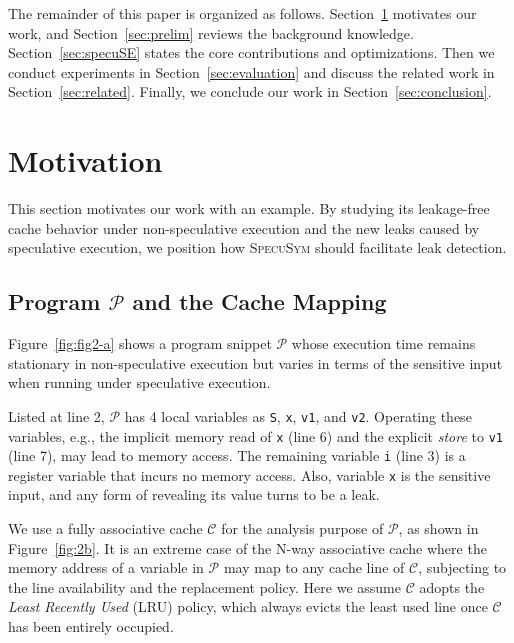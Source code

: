 \documentclass[sigconf,screen]{acmart}
\newcommand{\SpecuSym}{\textsc{SpecuSym} }
\newcommand{\prog}{\mathcal{P}}
\begin{document}
The remainder of this paper is organized as follows. Section~\ref{sec:mtv} 
motivates our work, and Section~\ref{sec:prelim} reviews the background 
knowledge. Section~\ref{sec:specuSE} states the core contributions and
optimizations. Then we conduct experiments in Section~\ref{sec:evaluation} 
and discuss the related work in Section~\ref{sec:related}. Finally, we 
conclude our work in Section~\ref{sec:conclusion}.


\section{Motivation}
\label{sec:mtv}

This section motivates our work with an example. By studying its 
leakage-free cache behavior under non-speculative execution and the new 
leaks caused by speculative execution, we position how \SpecuSym should
facilitate leak detection.


\subsection{Program ${\prog}$ and the Cache Mapping}
\label{sec:leak_example}

Figure~\ref{fig:fig2-a} shows a program snippet ${\prog}$ whose execution 
time remains stationary in non-speculative execution but varies in terms
of the sensitive input when running under speculative execution.


Listed at line 2, ${\prog}$ has 4 local variables as \texttt{S}, \texttt{x}, 
\texttt{v1}, and \texttt{v2}. Operating these variables, e.g., the implicit 
memory read of \texttt{x} (line 6) and the explicit \emph{store} to \texttt{v1} 
(line 7), may lead to memory access. The remaining variable \texttt{i} (line 3) 
is a register variable that incurs no memory access. Also, variable \texttt{x} 
is the sensitive input, and any form of revealing its value turns to be a leak. 



We use a fully associative cache $\mathcal{C}$ for the analysis purpose of 
$\prog$, as shown in Figure~\ref{fig:2b}. It is an extreme case of the N-way 
associative cache where the memory address of a variable in $\prog$ may map 
to any cache line of $\mathcal{C}$, subjecting to the line availability and 
the replacement policy. Here we assume $\mathcal{C}$ adopts the \emph{Least
Recently Used} (LRU) policy, which always evicts the least used line once 
$\mathcal{C}$ has been entirely occupied.
\end{document}
